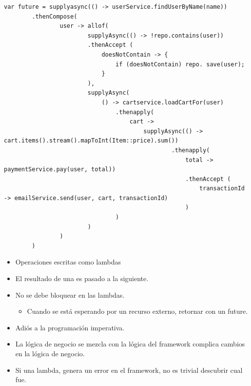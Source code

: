 \documentclass{presentacion}
\begin{document}
\begin{frame}
\fontsize{7pt}{8pt}\selectfont
 
    \begin{verbatim}
var future = supplyasync(() -> userService.findUserByName(name))
        .thenCompose(
                user -> allof(
                        supplyAsync(() -> !repo.contains(user))
                        .thenAccept (
                            doesNotContain -> {
                                if (doesNotContain) repo. save(user);
                            }
                        ),
                        supplyAsync(
                            () -> cartservice.loadCartFor(user)
                                .thenapply(
                                    cart ->
                                        supplyAsync(() -> cart.items().stream().mapToInt(Item::price).sum())
                                                .thenapply(
                                                    total -> paymentService.pay(user, total))
                                                    .thenAccept (
                                                        transactionId -> emailService.send(user, cart, transactionId)
                                                    )
                                )
                        )
                )
        )
    \end{verbatim}
\end{frame}

\begin{frame}
    \begin{itemize}
     \item Operaciones escritas como lambdas
     \item El resultado de una es pasado a la siguiente.
     \item No se debe bloquear en las lambdas.
     \begin{itemize}
        \item Cuando se está esperando por un recurso externo, retornar con un future.
     \end{itemize}
     \item Adiós a la programación imperativa.
     \item La lógica de negocio se mezcla con la lógica del framework \textrightarrow complica cambios en la lógica de negocio.
     \item Si una lambda, genera un error en el framework, no es trivial descubrir cual fue.
    \end{itemize}
\end{frame}
\end{document}
